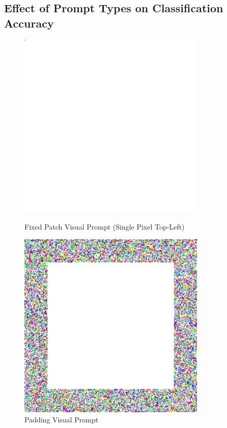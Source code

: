 \documentclass[a4paper]{article}
\begin{document}
\subsection{Effect of Prompt Types on Classification Accuracy}
\begin{figure}[h]
    \centering
    \begin{minipage}[b]{0.45\textwidth}
        \centering
        \includegraphics[width=0.8\textwidth]{"imgs/prompt_fixed_patch.png"}
        \caption{Fixed Patch Visual Prompt (Single Pixel Top-Left)}
        \label{fig:prompt-fixed}
    \end{minipage}
    \hfill
    \begin{minipage}[b]{0.45\textwidth}
        \centering
        \includegraphics[width=0.8\textwidth]{"imgs/prompt_padding.png"}
        \caption{Padding Visual Prompt}
        \label{fig:prompt-padding}
    \end{minipage}
\end{figure}
\end{document}

